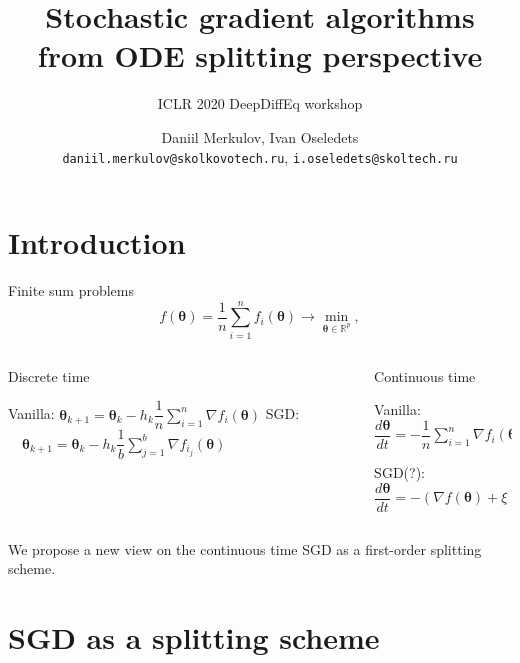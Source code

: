 \documentclass[aspectratio=169]{beamer}
\title{Stochastic gradient algorithms from ODE
splitting perspective}
\subtitle{ICLR 2020 DeepDiffEq workshop}
\author{Daniil Merkulov, Ivan Oseledets\\
{\small \texttt{daniil.merkulov@skolkovotech.ru}, \texttt{i.oseledets@skoltech.ru}}}
\institute{Skolkovo Institute of Science and Technology} %
\date{}
\newcommand{\vect}[1]{\boldsymbol{\mathbf{#1}}}
\begin{document}
\begingroup
\renewcommand{\insertframenumber}{}
 \begin{frame}[plain]
  \addtocounter{framenumber}{-1}
  \titlepage
 \end{frame}
\endgroup


\section{Introduction}

\begin{frame}{Finite sum problems}
\begin{equation*}\label{strang:finitesum}
    f(\vect{\vect{\theta}}) = \frac{1}{n} \sum_{i=1}^n f_i(\vect{\vect{\theta}}) \rightarrow \min_{\vect{\vect{\theta}} \in \mathbb{R}^p},
\end{equation*}

\pause

\begin{columns}

\begin{column}[t]{0.48\textwidth}
\begin{center}Discrete time\end{center}
Vanilla: $\vect{\theta}_{k+1} = \vect{\theta}_{k} - h_{k} \dfrac{1}{n} \sum\limits_{i=1}^n \nabla f_i(\vect{\vect{\theta}})$
\pause
SGD: $ \quad \vect{\theta}_{k+1} = \vect{\theta}_{k} - h_{k} \dfrac{1}{b} \sum\limits_{j=1}^b \nabla f_{i_j}(\vect{\vect{\theta}})$

\end{column}
\pause
\begin{column}[t]{0.48\textwidth}
\begin{center}Continuous time\end{center}
Vanilla: $\dfrac{d \vect{\theta}}{d t} = -\dfrac{1}{n} \sum\limits_{i=1}^n \nabla f_i(\vect{\vect{\theta}})$
\pause

SGD(?):  $\dfrac{d \vect{\theta}}{d t} = -\left(\nabla f(\vect{\vect{\theta}}) + \xi\right)$

\end{column}

\end{columns}
\pause
We propose a new view on the continuous time SGD as a first-order splitting scheme.

\end{frame}

\section{SGD as a splitting scheme}
\end{document}
